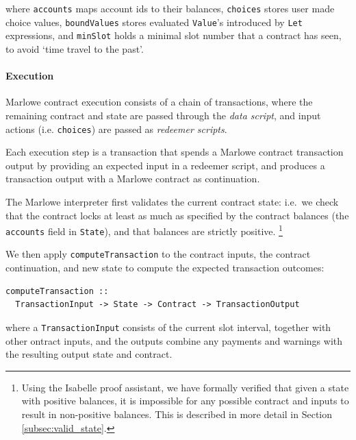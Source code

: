 \documentclass[runningheads]{llncs}
\begin{document}
\noindent
where \texttt{accounts} maps account ids to their balances, \texttt{choices} stores user made choice values,
\texttt{boundValues} stores evaluated \texttt{Value}'s introduced by \texttt{Let} expressions,
and \texttt{minSlot} holds a minimal slot number that a contract has seen, to avoid `time travel to the past'.

\paragraph{Execution}

Marlowe contract execution consists of a chain of transactions,
where the remaining contract and state are passed through the \emph{data script},
and input actions (i.e. \texttt{choices}) are passed as \emph{redeemer scripts}.

Each execution step is a transaction that spends a Marlowe contract transaction output by providing
an expected input in a redeemer script,
and produces a transaction output with a Marlowe contract as continuation.

The Marlowe interpreter first validates the current contract state: i.e.\
we check that the contract locks at least as much as specified by the
contract balances (the \texttt{accounts} field in \texttt{State}),
and that balances are strictly positive.
\footnote{
Using the Isabelle proof assistant, we have formally verified that given a state with positive balances,
it is impossible for any possible contract and inputs to result in non-positive balances.
This is described in more detail in Section \ref{subsec:valid_state}.}

We then apply  \texttt{computeTransaction}  to the contract inputs, the contract continuation, and new state to compute the expected transaction outcomes:
\begin{verbatim}
computeTransaction :: 
  TransactionInput -> State -> Contract -> TransactionOutput
\end{verbatim}
%
%
%
%
\noindent
where a \texttt{TransactionInput} consists of the current slot interval, together with other ontract inputs, and the outputs combine any payments and warnings with the resulting output state and contract.
\end{document}
